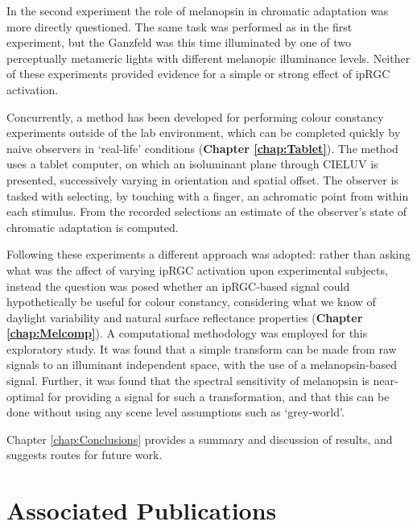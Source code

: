 In the second experiment the role of melanopsin in chromatic adaptation was more directly questioned. The same task was performed as in the first experiment, but the Ganzfeld was this time illuminated by one of two perceptually metameric lights with different melanopic illuminance levels. Neither of these experiments provided evidence for a simple or strong effect of ipRGC activation.

Concurrently, a method has been developed for performing colour constancy experiments outside of the lab environment, which can be completed quickly by naive observers in `real-life' conditions (\textbf{Chapter \ref{chap:Tablet}}). The method uses a tablet computer, on which an isoluminant plane through CIELUV is presented, successively varying in orientation and spatial offset. The observer is tasked with selecting, by touching with a finger, an achromatic point from within each stimulus. From the recorded selections an estimate of the observer's state of chromatic adaptation is computed.

Following these experiments a different approach was adopted: rather than asking what was the affect of varying \gls{ipRGC} activation upon experimental subjects, instead the question was posed whether an \gls{ipRGC}-based signal could hypothetically be useful for colour constancy, considering what we know of daylight variability and natural surface reflectance properties (\textbf{Chapter \ref{chap:Melcomp}}). A computational methodology was employed for this exploratory study. It was found that a simple transform can be made from raw signals to an illuminant independent space, with the use of a melanopsin-based signal. Further, it was found that the spectral sensitivity of melanopsin is near-optimal for providing a signal for such a transformation, and that this can be done without using any scene level assumptions such as `grey-world'.

Chapter \ref{chap:Conclusions} provides a summary and discussion of results, and suggests routes for future work.

\section{Associated Publications}

